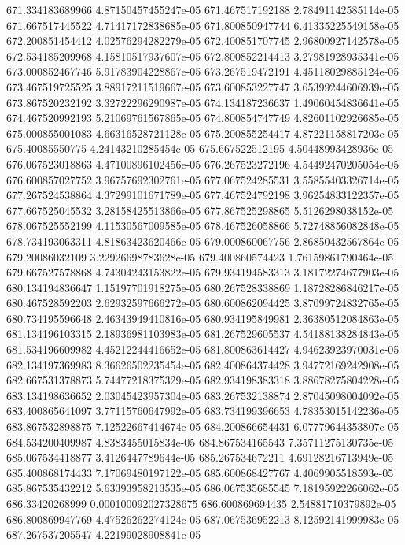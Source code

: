 {671.334183689966 4.87150457455247e-05
671.467517192188 2.78491142585114e-05
671.667517445522 4.71417172838685e-05
671.800850947744 6.41335225549158e-05
672.200851454412 4.02576294282279e-05
672.400851707745 2.96800927142578e-05
672.534185209968 4.15810517937607e-05
672.800852214413 3.27981928935341e-05
673.000852467746 5.91783904228867e-05
673.267519472191 4.45118029885124e-05
673.467519725525 3.88917211519667e-05
673.600853227747 3.65399244606939e-05
673.867520232192 3.32722296290987e-05
674.134187236637 1.49060454836641e-05
674.467520992193 5.21069761567865e-05
674.800854747749 4.82601102926685e-05
675.000855001083 4.66316528721128e-05
675.200855254417 4.87221158817203e-05
675.40085550775 4.24143210285454e-05
675.667522512195 4.50448993428936e-05
676.067523018863 4.47100896102456e-05
676.267523272196 4.54492470205054e-05
676.600857027752 3.96757692302761e-05
677.067524285531 3.55855403326714e-05
677.267524538864 4.37299101671789e-05
677.467524792198 3.96254833122357e-05
677.667525045532 3.28158425513866e-05
677.867525298865 5.5126298038152e-05
678.067525552199 4.11530567009585e-05
678.467526058866 5.72748856082848e-05
678.734193063311 4.81863423620466e-05
679.000860067756 2.86850432567864e-05
679.20086032109 3.22926698783628e-05
679.400860574423 1.76159861790464e-05
679.667527578868 4.74304243153822e-05
679.934194583313 3.18172274677903e-05
680.134194836647 1.15197701918275e-05
680.267528338869 1.18728286846217e-05
680.467528592203 2.62932597666272e-05
680.600862094425 3.87099724832765e-05
680.734195596648 2.46343949410816e-05
680.934195849981 2.36380512084863e-05
681.134196103315 2.18936981103983e-05
681.267529605537 4.54188138284843e-05
681.534196609982 4.45212244416652e-05
681.800863614427 4.94623923970031e-05
682.134197369983 8.36626502235454e-05
682.400864374428 3.94772169242908e-05
682.667531378873 5.74477218375329e-05
682.934198383318 3.88678275804228e-05
683.134198636652 2.03045423957304e-05
683.267532138874 2.87045098004092e-05
683.400865641097 3.77115760647992e-05
683.734199396653 4.78353015142236e-05
683.867532898875 7.12522667414674e-05
684.200866654431 6.07779644353807e-05
684.534200409987 4.8383455015834e-05
684.867534165543 7.35711275130735e-05
685.067534418877 3.4126447789644e-05
685.267534672211 4.69128216713949e-05
685.400868174433 7.17069480197122e-05
685.600868427767 4.4069905518593e-05
685.867535432212 5.63393958213535e-05
686.067535685545 7.18195922266062e-05
686.33420268999 0.000100092027328675
686.600869694435 2.54881710379892e-05
686.800869947769 4.47526262274124e-05
687.067536952213 8.12592141999983e-05
687.267537205547 4.22199028908841e-05
}
